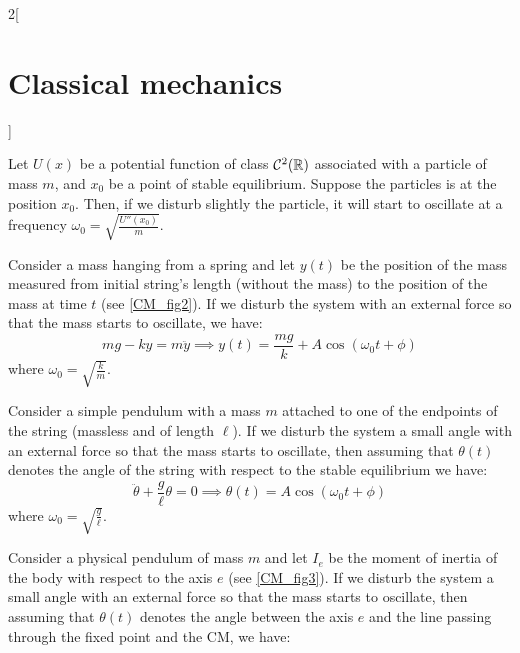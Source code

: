 \documentclass[../../../main_physics.tex]{subfiles}
\begin{document}
\begin{multicols}{2}[\section{Classical mechanics}]
\begin{definition}
  \end{definition}
  \begin{proposition}
    Let $U(x)$ be a potential function of class $\mathcal{C}^2(\mathbb{R})$ associated with a particle of mass $m$, and $x_0$ be a point of stable equilibrium. Suppose the particles is at the position $x_0$. Then, if we disturb slightly the particle, it will start to oscillate at a frequency $\omega_0=\sqrt{\frac{U''(x_0)}{m}}$.
  \end{proposition}
  \begin{proposition}
    Consider a mass hanging from a spring and let $y(t)$ be the position of the mass measured from initial string's length (without the mass) to the position of the mass at time $t$ (see \cref{CM_fig2}). If we disturb the system with an external force so that the mass starts to oscillate, we have: $$mg-ky=m\ddot{y}\implies y(t)=\frac{mg}{k}+A\cos(\omega_0t+\phi)$$ where $\omega_0=\sqrt{\frac{k}{m}}$.
    \begin{center}
      \begin{minipage}{\linewidth}
        \centering
        
        \label{CM_fig2}
      \end{minipage}
    \end{center}
  \end{proposition}
  \begin{proposition}
    Consider a simple pendulum with a mass $m$ attached to one of the endpoints of the string (massless and of length $\ell$). If we disturb the system a small angle with an external force so that the mass starts to oscillate, then assuming that $\theta(t)$ denotes the angle of the string with respect to the stable equilibrium we have:
    $$\ddot{\theta}+\frac{g}{\ell}\theta=0\implies\theta(t)=A\cos(\omega_0t+\phi)$$ where $\omega_0=\sqrt{\frac{g}{\ell}}$.
    \begin{center}
      \begin{minipage}{\linewidth}
        \centering
        
      \end{minipage}
    \end{center}
  \end{proposition}
  \begin{proposition}
    Consider a physical pendulum of mass $m$ and let $I_e$ be the moment of inertia of the body with respect to the axis $e$ (see \cref{CM_fig3}). If we disturb the system a small angle with an external force so that the mass starts to oscillate, then assuming that $\theta(t)$ denotes the angle between the axis $e$ and the line passing through the fixed point and the CM, we have:

\end{proposition}
\end{multicols}
\end{document}
